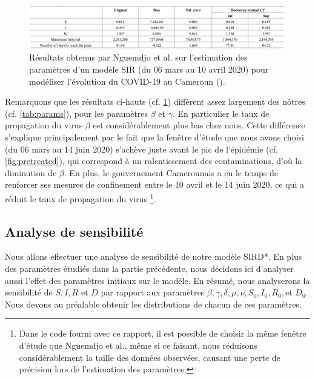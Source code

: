 \documentclass[
  french,
	10pt, %
]{fphw}
\begin{document}
\begin{figure}[H]
  \centering
  \includegraphics[width=\linewidth]{nguemdjo.png}
  \caption{Résultats obtenus par Nguemdjo et al. sur l'estimation des paramètres d'un modèle SIR (du 06 mars au 10 avril 2020) pour modéliser l'évolution du COVID-19 au Cameroun (\cite[p.4]{Nguemdjo}).}
  \label{fig:Nguemdjo}
\end{figure}

\noindent Remarquons que les résultats ci-hauts (cf. \cref{fig:Nguemdjo}) diffèrent assez largement des nôtres (cf. \cref{tab:params}), pour les paramètres $\beta$ et $\gamma$. En particulier le taux de propagation du virus $\beta$ est considérablement plus bas chez nous. Cette différence s'explique principalement par le fait que la fenêtre d'étude que nous avons choisi (du 06 mars au 14 juin 2020) s'achève juste avant le pic de l'épidémie (cf. \cref{fig:pretreated}), qui correspond à un ralentissement des contaminations, d'où la diminution de $\beta$. En plus, le gouvernement Camerounais a eu le temps de renforcer ses mesures de confinement entre le 10 avril et le 14 juin 2020, ce qui a réduit le taux de propagation du virus \footnote{Dans le code fourni avec ce rapport, il est possible de choisir la même fenêtre d'étude que Nguemdjo et al., même si ce faisant, nous réduisons considérablement la taille des données observées, causant une perte de précision lors de l'estimation des paramètres.}.

\subsection{Analyse de sensibilité}

Nous allons effectuer une analyse de sensibilité de notre modèle SIRD*. En plus des paramètres étudiés dans la partie précédente, nous décidons ici d'analyser aussi l'effet des paramètres initiaux sur le modèle. En résumé, nous analyserons la sensibilité de $S, I, R$ et $D$ par rapport aux paramètres $\beta, \gamma, \delta, \mu, \nu, S_0, I_0, R_0, $et $D_0$. Nous devons au préalable obtenir les distributions de chacun de ces paramètres.
\end{document}
